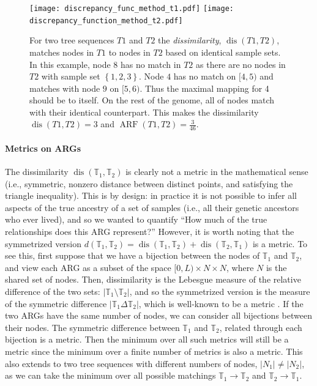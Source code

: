 \documentclass[10pt,twoside,lineno]{gsajnl}
\newcommand{\T}{\mathbb{T}}
\newcommand{\dis}{\operatorname{dis}}
\begin{document}
\begin{figure}[!ht]
	\begin{center}
\texttt{[image: discrepancy\_func\_method\_t1.pdf]}
\texttt{[image: discrepancy\_function\_method\_t2.pdf]}
    \caption{
        For two tree sequences $T1$ and $T2$ the \emph{dissimilarity}, $\dis(T1,T2)$, matches nodes in $T1$ to nodes in $T2$
        based on identical sample sets.
        In this example, node $8$ has no match in $T2$ as there are no nodes in $T2$ with sample set $\left\{1,2,3\right\}$.
        Node $4$ has no match on $[4,5)$ and matches with node $9$ on $[5,6)$. Thus the maximal mapping for 4 should be to itself. On the rest of the genome, all of nodes match with their identical counterpart.
        This makes the dissimilarity $\dis(T1,T2)=3$ and $\operatorname{ARF}(T1,T2)=\frac{3}{46}$.
        \label{fig:conceptual_discrepancy}
    }
	\end{center}
\end{figure}


\paragraph{Metrics on ARGs}
The dissimilarity $\dis(\T_1,\T_2)$ is clearly not a metric in the mathematical sense
(i.e., symmetric, nonzero distance between distinct points, and satisfying the triangle inequality).
This is by design: in practice it is not possible to infer all aspects
of the true ancestry of a set of samples (i.e., all their genetic ancestors who ever lived),
and so we wanted to quantify
``How much of the true relationships does this ARG represent?''
However, it is worth noting that the symmetrized version
$d(\T_1,\T_2) = \dis(\T_1,\T_2) + \dis(\T_2, \T_1)$ is a metric.
To see this, first suppose that we have a bijection between the nodes of $\T_1$ and $\T_2$,
and view each ARG as a subset of the space $[0,L) \times N \times N$,
where $N$ is the shared set of nodes.
Then, dissimilarity is the Lebesgue measure of the relative difference of the two sets:
$|\T_1 \setminus \T_2|$,
and so the symmetrized version is the measure of the symmetric difference
$|\T_1\Delta\T_2|$,
which is well-known to be a metric \citep{rudin1976principles}. 
If the two ARGs have the same number of nodes,
we can consider all bijections between their nodes.
The symmetric difference between $\T_1$ and $\T_2$,
related through each bijection is a metric.
Then the minimum over all such metrics will still be a metric
since the minimum over a finite number of metrics is also a metric.
This also extends to two tree sequences with different numbers of nodes,
$|N_1|\neq|N_2|$, as we can take the minimum over all possible matchings $\T_1\to\T_2$ and $\T_2\to\T_1$.
\end{document}

